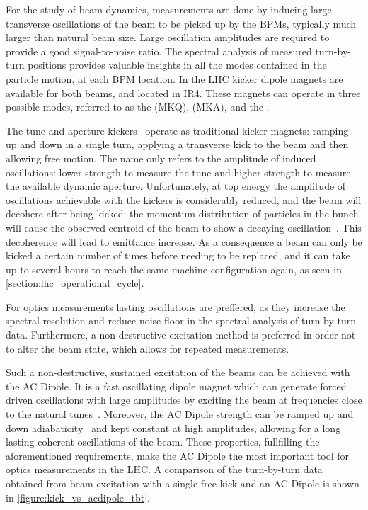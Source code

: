 For the study of beam dynamics, measurements are done by inducing large transverse oscillations of the beam to be picked up by the BPMs, typically much larger than natural beam size.
Large oscillation amplitudes are required to provide a good signal-to-noise ratio.
The spectral analysis of measured turn-by-turn positions provides valuable insights in all the modes contained in the particle motion, at each BPM location.
In the LHC kicker dipole magnets are available for both beams, and located in IR\num{4}.
These magnets can operate in three possible modes, referred to as the  (MKQ),  (MKA), and the .

The tune and aperture kickers~\cite{CERN:Barlow:Control_MKQA_LHC,IPMS:Carlier:Kicker_Pulse_Generator_Measurement_Tune_Dynamic_Aperture_LHC} operate as traditional kicker magnets: ramping up and down in a single turn, applying a transverse kick to the beam and then allowing free motion.
The name only refers to the amplitude of induced oscillations: lower strength to measure the tune and higher strength to measure the available dynamic aperture.
Unfortunately, at top energy the amplitude of oscillations achievable with the kickers is considerably reduced, and the beam will decohere after being kicked: the momentum distribution of particles in the bunch will cause the observed centroid of the beam to show a decaying oscillation~\cite{Report:Meller:Decoherence_Kicked_Beams}.
This decoherence will lead to emittance increase.
As a consequence a beam can only be kicked a certain number of times before needing to be replaced, and it can take up to several hours to reach the same machine configuration again, as seen in \cref{section:lhc_operational_cycle}.

For optics measurements lasting oscillations are preffered, as they increase the spectral resolution and reduce noise floor in the spectral analysis of turn-by-turn data.
Furthermore, a non-destructive excitation method is preferred in order not to alter the beam state, which allows for repeated measurements.

Such a non-destructive, sustained excitation of the beams can be achieved with the AC Dipole.
It is a fast oscillating dipole magnet which can generate forced driven oscillations with large amplitudes by exciting the beam at frequencies close to the natural tunes~\cite{PHD:Miyamoto,CERN:Serrano:LHC_ACDipole_Introduction}.
Moreover, the AC Dipole strength can be ramped up and down adiabaticity~\cite{PRAB:Tomas:Adiabaticity_Ramping_Process_AC_Dipole} and kept constant at high amplitudes, allowing for a long lasting coherent oscillations of the beam.
These properties, fullfilling the aforementioned requirements, make the AC Dipole the most important tool for optics measurements in the LHC.
A comparison of the turn-by-turn data obtained from beam excitation with a single free kick and an AC Dipole is shown in \cref{figure:kick_vs_acdipole_tbt}.

